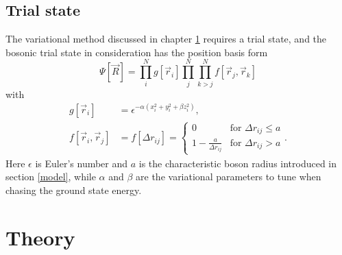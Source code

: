 \documentclass[a4paper,8pt]{article}
\begin{document}
\begin{multicols}{2}
\subsection{Trial state}
The variational method discussed in chapter \ref{theory} requires a trial state, and the bosonic trial state in consideration has the position basis form
\begin{equation}\label{trialstate}
\Psi[\vec{R}] = \prod\limits_i^N g[\vec{r}_i] \prod\limits_j^N\prod\limits_{k > j}^N f[\vec{r}_j,\vec{r}_k]
\end{equation}
with
\begin{align}
g[\vec{r}_i] &= \epsilon^{-\alpha\left(x_i^2+y_i^2+ \beta z_i^2\right)}, \label{g}\\
f[\vec{r}_i,\vec{r}_j] &= f[\Delta{r}_{ij}] = \begin{cases} 0 & \text{for $\Delta{r}_{ij} \leq a$} \\
1-\frac{a}{\Delta{r}_{ij}} & \text{for $\Delta{r}_{ij} > a$} \end{cases}. \label{f}
\end{align}
Here $\epsilon$ is Euler's number and $a$ is the characteristic boson radius introduced in section \ref{model}, while $\alpha$ and $\beta$ are the variational parameters to tune when chasing the ground state energy.



\section{Theory}\label{theory}


\end{multicols}
\end{document}
